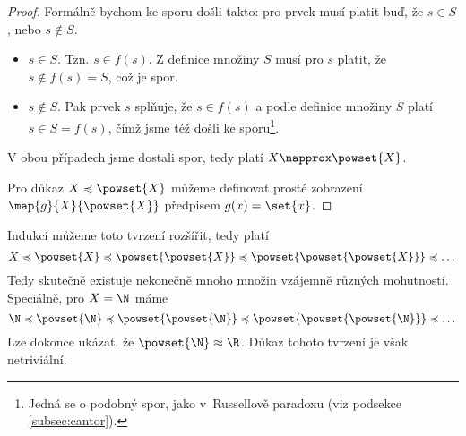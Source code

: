 \begin{proof}
    Formálně bychom ke sporu došli takto: pro prvek musí platit buď, že $s\in S$, nebo $s\notin S$.
    \begin{itemize}
        \item $s\in S$. Tzn. $s\in f(s)$. Z definice množiny $S$ musí pro $s$ platit, že $s\notin f(s)=S$, což je spor.
        \item $s\notin S$. Pak prvek $s$ splňuje, že $s\in f(s)$ a podle definice množiny $S$ platí $s\in S=f(s)$, čímž jsme též došli ke sporu\footnote{Jedná se o podobný spor, jako v~Russellově paradoxu (viz podsekce \ref{subsec:cantor}).}.
    \end{itemize}
    V obou případech jsme dostali spor, tedy platí $X\napprox\powset{X}$.\par
    Pro důkaz $X\preccurlyeq\powset{X}$ můžeme definovat prosté zobrazení $\map{g}{X}{\powset{X}}$ předpisem $g(x)=\set{x}$.
\end{proof}
Indukcí můžeme toto tvrzení rozšířit, tedy platí
\begin{equation*}
    X\preccurlyeq\powset{X}\preccurlyeq\powset{\powset{X}}\preccurlyeq\powset{\powset{\powset{X}}}\preccurlyeq\dots
\end{equation*}
Tedy skutečně existuje nekonečně mnoho množin vzájemně různých mohutností. Speciálně, pro $X=\N$ máme
\begin{equation*}
    \N\preccurlyeq\powset{\N}\preccurlyeq\powset{\powset{\N}}\preccurlyeq\powset{\powset{\powset{\N}}}\preccurlyeq\dots
\end{equation*}
Lze dokonce ukázat, že $\powset{\N}\approx\R$. Důkaz tohoto tvrzení je však netriviální.